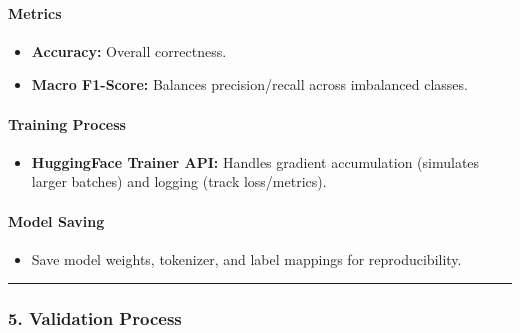 \documentclass[
]{article}
\providecommand{\tightlist}{%
  \setlength{\itemsep}{0pt}\setlength{\parskip}{0pt}}
\begin{document}
\paragraph{\texorpdfstring{\textbf{Metrics}}{Metrics}}\label{metrics}

\begin{itemize}
\tightlist
\item
  \textbf{Accuracy:} Overall correctness.\\
\item
  \textbf{Macro F1-Score:} Balances precision/recall across imbalanced
  classes.
\end{itemize}

\paragraph{\texorpdfstring{\textbf{Training
Process}}{Training Process}}\label{training-process}

\begin{itemize}
\tightlist
\item
  \textbf{HuggingFace Trainer API:} Handles gradient accumulation
  (simulates larger batches) and logging (track loss/metrics).
\end{itemize}

\paragraph{\texorpdfstring{\textbf{Model
Saving}}{Model Saving}}\label{model-saving}

\begin{itemize}
\tightlist
\item
  Save model weights, tokenizer, and label mappings for reproducibility.
\end{itemize}

\begin{center}\rule{0.5\linewidth}{0.5pt}\end{center}

\subsubsection{\texorpdfstring{\textbf{5. Validation
Process}}{5. Validation Process}}\label{validation-process}
\end{document}
